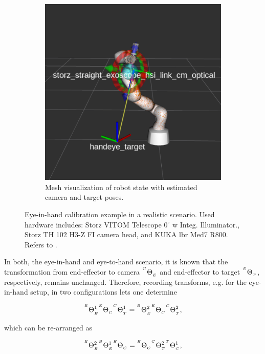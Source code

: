 \begin{figure}[htb]
\begin{subfigure}[b]{0.49\textwidth}
        \includegraphics[width=\textwidth]{introduction/img/aruco_world.png}
        \caption{Mesh visualization of robot state with estimated camera and target poses.}
    \end{subfigure}
    \caption{Eye-in-hand calibration example in a realistic scenario. Used hardware includes: Storz VITOM Telescope $0^\circ$ w Integ. Illuminator., Storz TH 102 H3-Z FI camera head, and KUKA \gls{lbr} Med7 R800. Refers to .}
    \label{in:fig:eye_in_hand_setup}
\end{figure}
In both, the eye-in-hand and eye-to-hand scenario, it is known that the transformation from end-effector to camera ${}^{^C}\Theta_{_E}$ and end-effector to target ${}^{^E}\Theta_{_T}$, respectively, remains unchanged. Therefore, recording transforms, e.g. for the eye-in-hand setup, in two configurations lets one determine

\begin{equation}
    {}^{^B}\Theta_{_E}^{1}{}^{^E}\Theta_{_C}{}^{^C}\Theta_{_T}^{1} = {}^{^B}\Theta_{_E}^{2}{}^{^E}\Theta_{_C}{}^{^C}\Theta_{_T}^{2},
\end{equation}

which can be re-arranged as

\begin{equation}
    {}^{^E}\Theta_{_B}^{2}{}^{^B}\Theta_{_E}^{1}{}^{^E}\Theta_{_C} = {}^{^E}\Theta_{_C}{}^{^C}\Theta_{_T}^{2}{}^{^T}\Theta_{_C}^{1},
\end{equation}

